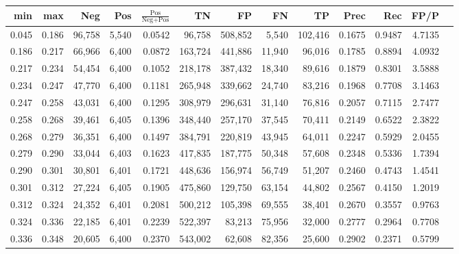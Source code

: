 \begin{tabular}{rrrrrrrrrrrrr}
\toprule
  min &   max &    Neg &   Pos & $\frac{\text{Pos}}{\text{Neg}+\text{Pos}}$ &      TN &      FP &      FN &      TP &   Prec &    Rec &   FP/P \\
\midrule
0.045 & 0.186 & 96,758 & 5,540 &                                     0.0542 &  96,758 & 508,852 &   5,540 & 102,416 & 0.1675 & 0.9487 & 4.7135 \\
0.186 & 0.217 & 66,966 & 6,400 &                                     0.0872 & 163,724 & 441,886 &  11,940 &  96,016 & 0.1785 & 0.8894 & 4.0932 \\
0.217 & 0.234 & 54,454 & 6,400 &                                     0.1052 & 218,178 & 387,432 &  18,340 &  89,616 & 0.1879 & 0.8301 & 3.5888 \\
0.234 & 0.247 & 47,770 & 6,400 &                                     0.1181 & 265,948 & 339,662 &  24,740 &  83,216 & 0.1968 & 0.7708 & 3.1463 \\
0.247 & 0.258 & 43,031 & 6,400 &                                     0.1295 & 308,979 & 296,631 &  31,140 &  76,816 & 0.2057 & 0.7115 & 2.7477 \\
0.258 & 0.268 & 39,461 & 6,405 &                                     0.1396 & 348,440 & 257,170 &  37,545 &  70,411 & 0.2149 & 0.6522 & 2.3822 \\
0.268 & 0.279 & 36,351 & 6,400 &                                     0.1497 & 384,791 & 220,819 &  43,945 &  64,011 & 0.2247 & 0.5929 & 2.0455 \\
0.279 & 0.290 & 33,044 & 6,403 &                                     0.1623 & 417,835 & 187,775 &  50,348 &  57,608 & 0.2348 & 0.5336 & 1.7394 \\
0.290 & 0.301 & 30,801 & 6,401 &                                     0.1721 & 448,636 & 156,974 &  56,749 &  51,207 & 0.2460 & 0.4743 & 1.4541 \\
0.301 & 0.312 & 27,224 & 6,405 &                                     0.1905 & 475,860 & 129,750 &  63,154 &  44,802 & 0.2567 & 0.4150 & 1.2019 \\
0.312 & 0.324 & 24,352 & 6,401 &                                     0.2081 & 500,212 & 105,398 &  69,555 &  38,401 & 0.2670 & 0.3557 & 0.9763 \\
0.324 & 0.336 & 22,185 & 6,401 &                                     0.2239 & 522,397 &  83,213 &  75,956 &  32,000 & 0.2777 & 0.2964 & 0.7708 \\
0.336 & 0.348 & 20,605 & 6,400 &                                     0.2370 & 543,002 &  62,608 &  82,356 &  25,600 & 0.2902 & 0.2371 & 0.5799 \\

\end{tabular}
